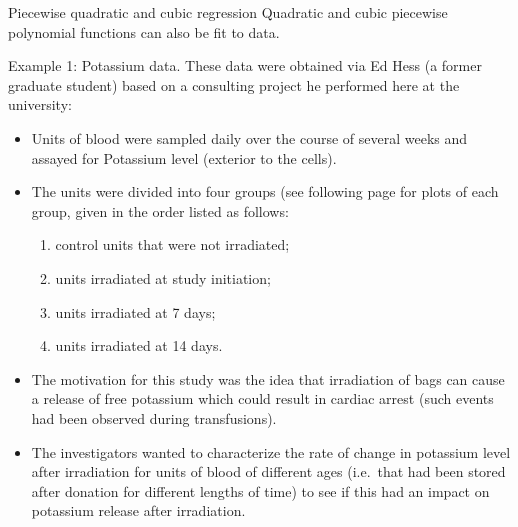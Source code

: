 \documentclass[
  9pt,
  ignorenonframetext,
]{beamer}
\providecommand{\tightlist}{%
  \setlength{\itemsep}{0pt}\setlength{\parskip}{0pt}}
\begin{document}
\begin{frame}{Piecewise quadratic and cubic regression}
\protect\hypertarget{piecewise-quadratic-and-cubic-regression}{}
Quadratic and cubic piecewise polynomial functions can also be fit to
data.

\begin{block}{Example 1: Potassium data.}
\protect\hypertarget{example-1-potassium-data.}{}
These data were obtained via Ed Hess (a former graduate student) based
on a consulting project he performed here at the university:

\begin{itemize}
\item
  Units of blood were sampled daily over the course of several weeks and
  assayed for Potassium level (exterior to the cells).
\item
  The units were divided into four groups (see following page for plots
  of each group, given in the order listed as follows:

  \begin{enumerate}
  \tightlist
  \item
    control units that were not irradiated;
  \item
    units irradiated at study initiation;
  \item
    units irradiated at 7 days;
  \item
    units irradiated at 14 days.
  \end{enumerate}
\item
  The motivation for this study was the idea that irradiation of bags
  can cause a release of free potassium which could result in cardiac
  arrest (such events had been observed during transfusions).
\item
  The investigators wanted to characterize the rate of change in
  potassium level after irradiation for units of blood of different ages
  (i.e.~that had been stored after donation for different lengths of
  time) to see if this had an impact on potassium release after
  irradiation.
\end{itemize}
\end{block}
\end{frame}
\end{document}
